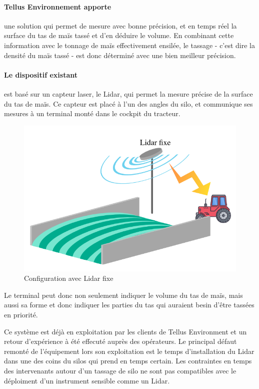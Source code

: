 \documentclass[12pt,a4paper]{report}
\begin{document}
\paragraph{Tellus Environnement apporte} une solution qui permet de mesure avec bonne précision, et en temps réel la surface du tas de maïs tassé et d'en déduire le volume. En combinant cette information avec le tonnage de maïs effectivement ensilée, le tassage - c'est dire la densité du maïs tassé - est donc déterminé avec une bien meilleur précision.

\paragraph{Le dispositif existant} est basé sur un capteur laser, le Lidar, qui permet la mesure précise de la surface du tas de maïs. Ce capteur est placé à l'un des angles du silo, et communique ses mesures à un terminal monté dans le cockpit du tracteur.

\begin{figure}[H]
	\centering
	\includegraphics[width=0.7\linewidth]{img/LidarFixe}
	\caption[]{Configuration avec Lidar fixe}
	\label{fig:lidarfixe}
\end{figure}

Le terminal peut donc non seulement indiquer le volume du tas de maïs, mais aussi sa forme et donc indiquer les parties du tas qui auraient besin d'être tassées en priorité.
\newline

Ce système est déjà en exploitation par les clients de Tellus Environment et un retour d'expérience à été effecuté auprès des opérateurs. Le principal défaut remonté de l'équipement lors son exploitation est le temps d'installation du Lidar dans une des coins du silos qui prend en temps certain. Les contraintes en temps des intervenants autour d'un tassage de silo ne sont pas compatibles avec le déploiment d'un instrument sensible comme un Lidar.
\end{document}
